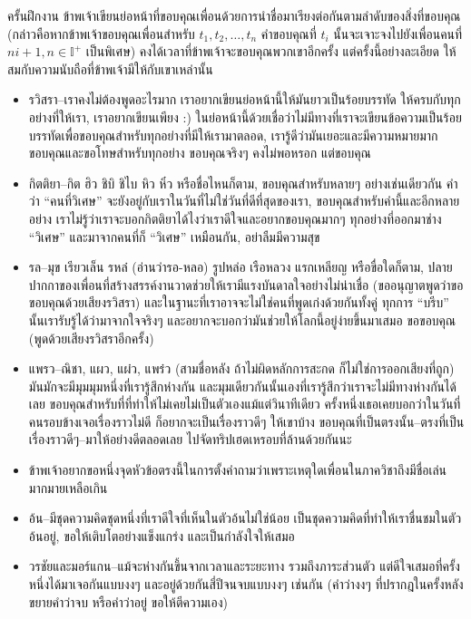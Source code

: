 ครั้นฝึกงาน ข้าพเจ้าเขียนย่อหน้าที่ขอบคุณเพื่อนด้วยการนำชื่อมาเรียงต่อกันตามลำดับของสิ่งที่ขอบคุณ (กล่าวคือหากข้าพเจ้าขอบคุณเพื่อนสำหรับ \(t_1, t_2, \dots, t_n\) คำขอบคุณที่ \(t_i\) นั้นจะเจาะจงไปยังเพื่อนคนที่ \(ni+1, n \in \mathbb{I}^+\) เป็นพิเศษ) คงได้เวลาที่ข้าพเจ้าจะขอบคุณพวกเขาอีกครั้ง แต่ครั้งนี้อย่างละเอียด ให้สมกับความนับถือที่ข้าพเจ้ามีให้กับเขาเหล่านั้น
\begin{itemize}
    \item รวิสรา--เราคงไม่ต้องพูดอะไรมาก เราอยากเขียนย่อหน้านี้ให้มันยาวเป็นร้อยบรรทัด ให้ครบกับทุกอย่างที่ให้เรา, เราอยากเขียนเพียง :) ในย่อหน้านี้ด้วยเชื่อว่าไม่มีทางที่เราจะเขียนข้อความเป็นร้อยบรรทัดเพื่อขอบคุณสำหรับทุกอย่างที่มีให้เรามาตลอด, เรารู้ดีว่ามันเยอะและมีความหมายมาก ขอบคุณและขอโทษสำหรับทุกอย่าง ขอบคุณจริงๆ คงไม่พอหรอก แต่ขอบคุณ
    \item กิตติยา--กิต ฮิว ชิบิ ชิไบ หิว หิ๋ว หรือชื่อไหนก็ตาม, ขอบคุณสำหรับหลายๆ อย่างเช่นเดียวกัน คำว่า ``คนที่วิเศษ'' จะยังอยู่กับเราในวันที่ไม่ใช่วันที่ดีที่สุดของเรา, ขอบคุณสำหรับคำนี้และอีกหลายอย่าง เราไม่รู้ว่าเราจะบอกกิตติยาได้ไงว่าเราดีใจและอยากขอบคุณมากๆ ทุกอย่างที่ออกมาช่าง ``วิเศษ'' และมาจากคนที่ก็ ``วิเศษ'' เหมือนกัน, อย่าลืมมีความสุข
    \item รล--มุข เรียวเล็น รหล๋ (อ่านว่ารอ-หลอ) รูปหล่อ เรือหลวง แรกเหลียญ หรือขื่อใดก็ตาม, ปลายปากกาของเพื่อนที่สร้างสรรค์งานวาดช่วยให้เรามีแรงบันดาลใจอย่างไม่น่าเชื่อ (ขออนุญาตพูดว่าขอขอบคุณด้วยเสียงรวิสรา) และในฐานะที่เราอาจจะไม่ใช่คนที่พูดเก่งด้วยกันทั้งคู่ ทุกการ ``บรีบ'' นั้นเรารับรู้ได้ว่ามาจากใจจริงๆ และอยากจะบอกว่ามันช่วยให้โลกนี้อยู่ง่ายขึ้นมาเสมอ ขอขอบคุณ (พูดด้วยเสียงรวิสราอีกครั้ง)
    \item แพรว--ณิชา, แผว, แผ๋ว, แพร๋ว (สามชื่อหลัง ถ้าไม่ผิดหลักการสะกด ก็ไม่ใช่การออกเสียงที่ถูก) มันมักจะมีมุมมุมหนึ่งที่เรารู้สึกห่างกัน และมุมเดียวกันนั้นเองที่เรารู้สึกว่าเราจะไม่มีทางห่างกันได้เลย ขอบคุณสำหรับที่ที่ทำให้ไม่เคยไม่เป็นตัวเองแม้แต่วินาทีเดียว ครั้งหนึ่งเธอเคยบอกว่าในวันที่คนรอบข้างเจอเรื่องราวไม่ดี ก็อยากจะเป็นเรื่องราวดีๆ ให้เขาบ้าง ขอบคุณที่เป็นตรงนั้น--ตรงที่เป็นเรื่องราวดีๆ--มาให้อย่างดีตลอดเลย ไปจัดทริปเฮดเหรอบที่ล้านด้วยกันนะ
    \item ข้าพเจ้าอยากขอหนึ่งจุดหัวข้อตรงนี้ในการตั้งคำถามว่าเพราะเหตุใดเพื่อนในภาควิชาถึงมีชื่อเล่นมากมายเหลือเกิน
    \item อ้น--มีชุดความคิดชุดหนึ่งที่เราดีใจที่เห็นในตัวอ้นไม่ใช่น้อย เป็นชุดความคิดที่ทำให้เราชื่นชมในตัวอ้นอยู่, ขอให้เติบโตอย่างแข็งแกร่ง และเป็นกำลังใจให้เสมอ
    \item วรชัยและมอร์แกน--แม้จะห่างกันขึ้นจากเวลาและระยะทาง รวมถึงภาระส่วนตัว แต่ดีใจเสมอที่ครั้งหนึ่งได้มาเจอกันแบบงงๆ และอยู่ด้วยกันสี่ปีจนจบแบบงงๆ เช่นกัน (คำว่างงๆ ที่ปรากฎในครั้งหลัง ขยายคำว่าจบ หรือคำว่าอยู่ ขอให้ตีความเอง)

\end{itemize}
